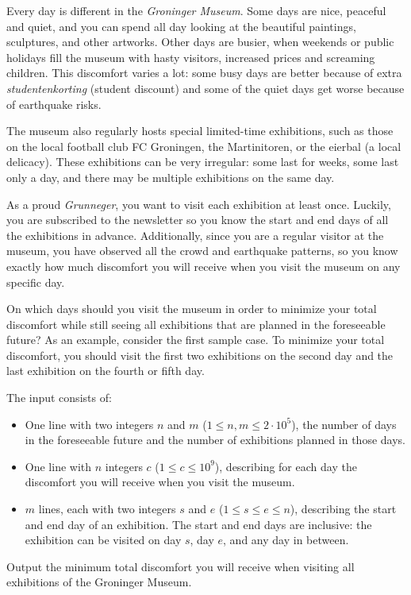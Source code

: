 \problemname{}


\newcommand{\maxn}{2\cdot10^5}
\newcommand{\maxc}{10^9}

Every day is different in the \emph{Groninger Museum}.
Some days are nice, peaceful and quiet,
and you can spend all day looking at the beautiful paintings, sculptures, and other artworks.
Other days are busier,
when weekends or public holidays fill the museum with hasty visitors, increased prices and screaming children.
This discomfort varies a lot:
some busy days are better because of extra \emph{studentenkorting} (student discount)
and some of the quiet days get worse because of earthquake risks.

The museum also regularly hosts special limited-time exhibitions,
such as those on the local football club FC Groningen, the Martinitoren, or the eierbal (a local delicacy).
These exhibitions can be very irregular:
some last for weeks, some last only a day, and there may be multiple exhibitions on the same day.

As a proud \emph{Grunneger}, you want to visit each exhibition at least once.
Luckily, you are subscribed to the newsletter so you know the start and end days of all the exhibitions in advance.
Additionally, since you are a regular visitor at the museum, you have observed all the crowd and earthquake patterns,
so you know exactly how much discomfort you will receive when you visit the museum on any specific day.

On which days should you visit the museum in order to minimize your total discomfort
while still seeing all exhibitions that are planned in the foreseeable future?
As an example, consider the first sample case.
To minimize your total discomfort,
you should visit the first two exhibitions on the second day
and the last exhibition on the fourth or fifth day.

\begin{Input}
    The input consists of:
    \begin{itemize}
        \item One line with two integers $n$ and $m$ ($1\leq n,m\leq \maxn$),
            the number of days in the foreseeable future and the number of exhibitions planned in those days.
        \item One line with $n$ integers $c$ ($1\leq c\leq \maxc$),
            describing for each day the discomfort you will receive when you visit the museum.
        \item $m$ lines, each with two integers $s$ and $e$ ($1\leq s\leq e\leq n$),
            describing the start and end day of an exhibition.
            The start and end days are inclusive: the exhibition can be visited on day $s$, day $e$, and any day in between.
    \end{itemize}
\end{Input}

\begin{Output}
    Output the minimum total discomfort you will receive
    when visiting all exhibitions of the Groninger Museum.
\end{Output}
